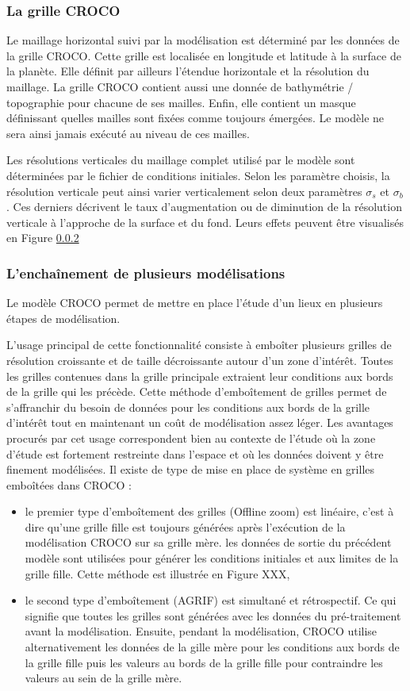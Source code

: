 \documentclass[10pt,a4paper,titlepage]{article}
\begin{document}
\subsubsection{La grille CROCO}
Le maillage horizontal suivi par la modélisation est déterminé par les données de la grille CROCO. Cette grille est localisée en longitude et latitude à la surface de la planète.
Elle définit par ailleurs l'étendue horizontale et la résolution du maillage.
La grille CROCO contient aussi une donnée de bathymétrie / topographie pour chacune de ses mailles.
Enfin, elle contient un masque définissant quelles mailles sont fixées comme toujours émergées.
Le modèle ne sera ainsi jamais exécuté au niveau de ces mailles.

Les résolutions verticales du maillage complet utilisé par le modèle sont déterminées par le fichier de conditions initiales.
Selon les paramètre choisis, la résolution verticale peut ainsi varier verticalement selon deux paramètres $\sigma_{s}$ et $\sigma_{b}$.
Ces derniers décrivent le taux d'augmentation ou de diminution de la résolution verticale à l'approche de la surface et du fond.
Leurs effets peuvent être visualisés en Figure \ref{}

\subsubsection{L'enchaînement de plusieurs modélisations}
Le modèle CROCO permet de mettre en place l'étude d'un lieux en plusieurs étapes de modélisation.

L'usage principal de cette fonctionnalité consiste à emboîter plusieurs grilles de résolution croissante et de taille décroissante autour d'un zone d'intérêt.
Toutes les grilles contenues dans la grille principale extraient leur conditions aux bords de la grille qui les précède.
Cette méthode d'emboîtement de grilles permet de s'affranchir du besoin de données pour les conditions aux bords de la grille d'intérêt tout en maintenant un coût de modélisation assez léger.
Les avantages procurés par cet usage correspondent bien au contexte de l'étude où la zone d'étude est fortement restreinte dans l'espace et où les données doivent y être finement modélisées.
Il existe de type de mise en place de système en grilles emboîtées dans CROCO :
\begin{itemize}
    \item le premier type d'emboîtement des grilles (Offline zoom) est linéaire, c'est à dire qu'une grille fille est toujours générées après l'exécution de la modélisation CROCO sur sa grille mère.
    les données de sortie du précédent modèle sont utilisées pour générer les conditions initiales et aux limites de la grille fille.
    Cette méthode est illustrée en Figure XXX,
    \item le second type d'emboîtement (AGRIF) est simultané et rétrospectif.
    Ce qui signifie que toutes les grilles sont générées avec les données du pré-traitement avant la modélisation.
    Ensuite, pendant la modélisation, CROCO utilise alternativement les données de la gille mère pour les conditions aux bords de la grille fille puis les valeurs au bords de la grille fille pour contraindre les valeurs au sein de la grille mère.
\end{itemize}
\end{document}

